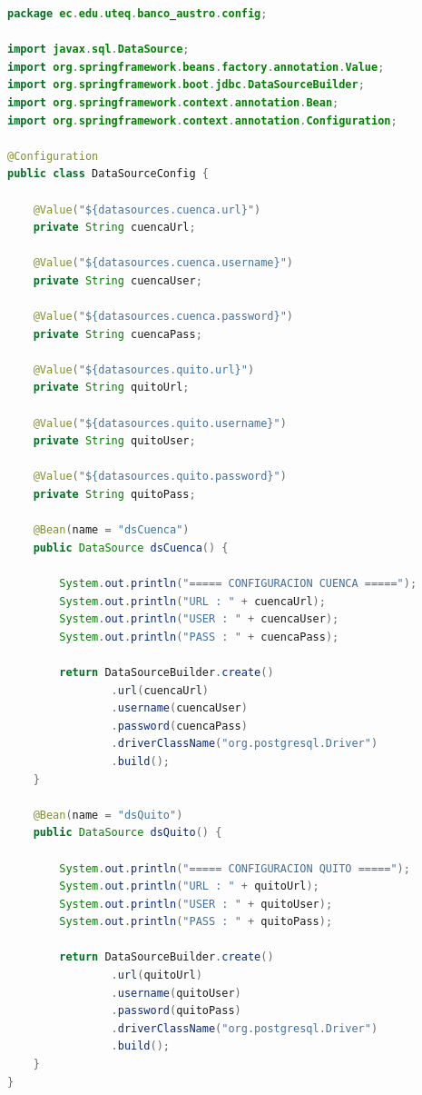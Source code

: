 \documentclass[11pt,a4paper]{article}
\begin{document}
\begin{lstlisting}[language=Java, caption={DataSourceConfig.java}]
package ec.edu.uteq.banco_austro.config;

import javax.sql.DataSource;
import org.springframework.beans.factory.annotation.Value;
import org.springframework.boot.jdbc.DataSourceBuilder;
import org.springframework.context.annotation.Bean;
import org.springframework.context.annotation.Configuration;

@Configuration
public class DataSourceConfig {

    @Value("${datasources.cuenca.url}")
    private String cuencaUrl;

    @Value("${datasources.cuenca.username}")
    private String cuencaUser;

    @Value("${datasources.cuenca.password}")
    private String cuencaPass;

    @Value("${datasources.quito.url}")
    private String quitoUrl;

    @Value("${datasources.quito.username}")
    private String quitoUser;

    @Value("${datasources.quito.password}")
    private String quitoPass;

    @Bean(name = "dsCuenca")
    public DataSource dsCuenca() {

        System.out.println("===== CONFIGURACION CUENCA =====");
        System.out.println("URL : " + cuencaUrl);
        System.out.println("USER : " + cuencaUser);
        System.out.println("PASS : " + cuencaPass);

        return DataSourceBuilder.create()
                .url(cuencaUrl)
                .username(cuencaUser)
                .password(cuencaPass)
                .driverClassName("org.postgresql.Driver")
                .build();
    }

    @Bean(name = "dsQuito")
    public DataSource dsQuito() {

        System.out.println("===== CONFIGURACION QUITO =====");
        System.out.println("URL : " + quitoUrl);
        System.out.println("USER : " + quitoUser);
        System.out.println("PASS : " + quitoPass);

        return DataSourceBuilder.create()
                .url(quitoUrl)
                .username(quitoUser)
                .password(quitoPass)
                .driverClassName("org.postgresql.Driver")
                .build();
    }
}
\end{lstlisting}

\FloatBarrier
\end{document}
